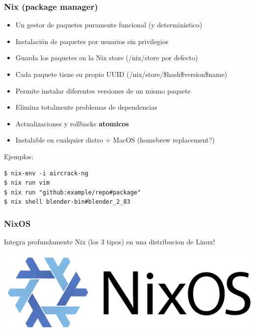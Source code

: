 \documentclass[aspectratio=43]{beamer}
\begin{document}
\begin{frame}[fragile]
    \frametitle{Nix (package manager)}
\begin{itemize}
    \item Un gestor de paquetes puramente funcional (y deterministico)
    \item Instalación de paquetes por usuarios sin privilegios
    \item Guarda los paquetes en la Nix store (/nix/store por defecto)
    \item Cada paquete tiene su propio UUID (/nix/store/\$hash\$version\$name)
    \item Permite instalar diferentes versiones de un mismo paquete
    \item Elimina totalmente problemas de dependencias
    \item Actualizaciones y rollbacks \textbf{atomicos}
    \item Instalable en cualquier distro + MacOS (homebrew replacement?)
\end{itemize}
\begin{block}{Ejemplos:}
\begin{verbatim}
$ nix-env -i aircrack-ng
$ nix run vim
$ nix run "github:example/repo#package"
$ nix shell blender-bin#blender_2_83
\end{verbatim}
\end{block}
\end{frame}

\begin{frame}
    \frametitle{NixOS}

    \begin{center}
        Integra profundamente Nix (los 3 tipos) en una distribucion de Linux!
    \end{center}
    \vspace{20}
    \begin{center}
        \includegraphics[scale=0.1]{img/1280px-NixOS_logo.svg.png}
    \end{center}
\end{frame}

\end{document}
